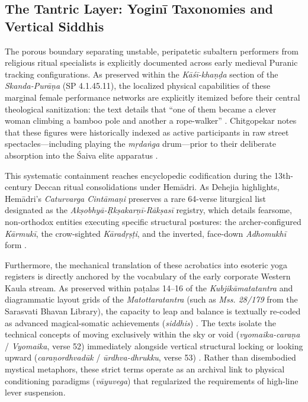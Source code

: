 \documentclass[11pt,twoside,letterpaper]{article}
\begin{document}
\subsection{The Tantric Layer: Yoginī Taxonomies and Vertical Siddhis}

The porous boundary separating unstable, peripatetic subaltern performers from religious ritual specialists is explicitly documented across early medieval Puranic tracking configurations. As preserved within the \textit{Kāśī-khaṇḍa} section of the \textit{Skanda-Purāṇa} (SP 4.1.45.11), the localized physical capabilities of these marginal female performance networks are explicitly itemized before their central theological sanitization: the text details that ``one of them became a clever woman climbing a bamboo pole and another a rope-walker'' \citep{Shastri1991}. Chitgopekar notes that these figures were historically indexed as active participants in raw street spectacles—including playing the \textit{mṛdaṅga} drum—prior to their deliberate absorption into the Śaiva elite apparatus \citep{Chitgopekar2002}.

This systematic containment reaches encyclopedic codification during the 13th-century Deccan ritual consolidations under Hemādri. As Dehejia highlights, Hemādri’s \textit{Caturvarga Cintāmaṇi} preserves a rare 64-verse liturgical list designated as the \textit{Akṣobhyā-Ṛkṣakarṇī-Rākṣasī} registry, which details fearsome, non-orthodox entities executing specific structural postures: the archer-configured \textit{Kārmukī}, the crow-sighted \textit{Kāradṛṣṭi}, and the inverted, face-down \textit{Adhomukhī} form \citep{Dehejia1986}.

Furthermore, the mechanical translation of these acrobatics into esoteric yoga registers is directly anchored by the vocabulary of the early corporate Western Kaula stream. As preserved within paṭalas 14–16 of the \textit{Kubjikāmatatantra} and diagrammatic layout grids of the \textit{Matottaratantra} (such as \textit{Mss. 28/179} from the Sarasvati Bhavan Library), the capacity to leap and balance is textually re-coded as advanced magical-somatic achievements (\textit{siddhis}) \citep{Dehejia1986}. The texts isolate the technical concepts of moving exclusively within the sky or void (\textit{vyomaika-caraṇa} / \textit{Vyomaika}, verse 52) immediately alongside vertical structural locking or looking upward (\textit{caraṇordhvadūk} / \textit{ūrdhva-dhrukku}, verse 53) \citep{Dehejia1986, Mallinson2007}. Rather than disembodied mystical metaphors, these strict terms operate as an archival link to physical conditioning paradigms (\textit{vāyuvega}) that regularized the requirements of high-line lever suspension.
\end{document}
